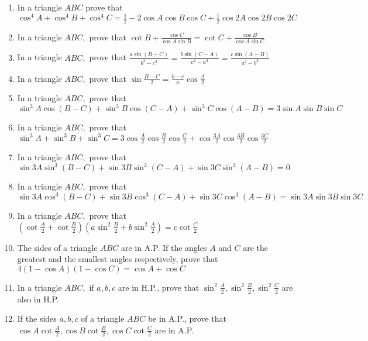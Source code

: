 \begin{enumerate}
\item In a triangle $ABC$ prove that $\cos^4A + \cos^4B + \cos^4C = \frac{1}{2} - 2\cos A\cos B\cos C + \frac{1}{2}\cos
     2A\cos 2B\cos 2C$

\item In a triangle $ABC,$ prove that $\cot B + \frac{\cos C}{\cos A\sin B} = \cot C + \frac{\cos B}{\cos A\sin C}$

\item In a triangle $ABC,$ prove that $\frac{a\sin(B - C)}{b^2 - c^2} = \frac{b\sin(C - A)}{c^2 - a^2} = \frac{c\sin(A -
     B)}{a^2 - b^2}$

\item In a triangle $ABC,$ prove that $\sin\frac{B - C}{2} = \frac{b - c}{a}\cos \frac{A}{2}$

\item In a triangle $ABC,$ prove that $\sin^3A\cos(B - C) + \sin^3B\cos(C - A) + \sin^3C\cos(A - B) = 3\sin A\sin B\sin
     C$

\item In a triangle $ABC,$ prove that $\sin^3A + \sin^3B + \sin^3C = 3\cos\frac{A}{2}\cos\frac{B}{2}\cos\frac{C}{2} +
     \cos\frac{3A}{2}\cos\frac{3B}{2}\cos\frac{3C}{2}$

\item In a triangle $ABC,$ prove that $\sin3A\sin^3(B - C) + \sin3B\sin^3(C - A) + \sin3C\sin^3(A - B) = 0$

\item In a triangle $ABC,$ prove that $\sin3A\cos^3(B - C) + \sin3B\cos^3(C - A) + \sin3C\cos^3(A - B) = \sin 3A\sin
     3B\sin 3C$

\item In a triangle $ABC,$ prove that $\left(\cot\frac{A}{2} + \cot\frac{B}{2}\right)\left(a\sin^2\frac{B}{2} +
     b\sin^2\frac{A}{2}\right) = c\cot\frac{C}{2}$

\item The sides of a triangle $ABC$ are in A.P. If the angles $A$ and $C$ are the greatest and the smallest angles
     respectively, prove that $4(1 - \cos A)(1 - \cos C) = \cos A + \cos C$

\item In a triangle $ABC,$ if $a, b, c$ are in H.P., prove that $\sin^2\frac{A}{2}, \sin^2\frac{B}{2},
     \sin^2\frac{C}{2}$ are also in H.P.

\item If the sides $a, b, c$ of a triangle $ABC$ be in A.P., prove that $\cos A\cot\frac{A}{2}, \cos
     B\cot\frac{B}{2}, \cos C\cot\frac{C}{2}$ are in A.P.


\end{enumerate}
